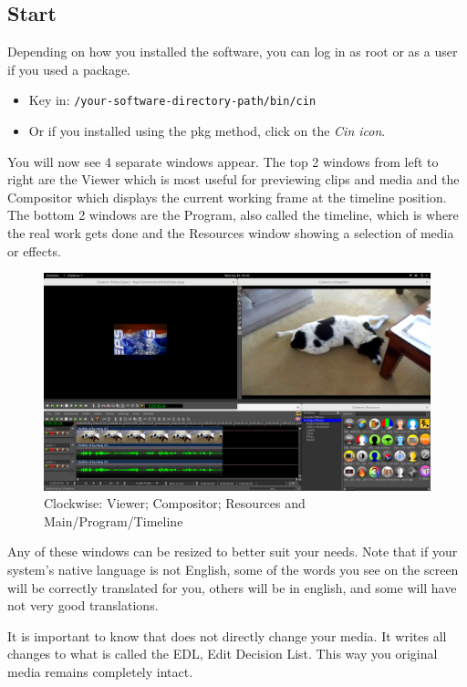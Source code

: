 \subsection{Start \CGG{}}%
\label{sub:start_cinelerra_gg}

Depending on how you installed the software, you can log in as root or as a user if you used a package.

\begin{itemize}[noitemsep]
	\item Key in:  \texttt{/your-software-directory-path/bin/cin}
	\item Or if you installed using the pkg method, click on the \textit{Cin icon}.
\end{itemize}

You will now see 4 separate windows appear.  The top 2 windows from left to right are the Viewer which is most useful for previewing clips and media and the Compositor which displays the current working frame at the timeline position.  The bottom 2 windows are the \CGG{} Program, also called the timeline, which is where the real work gets done and the Resources window showing a selection of media or effects.

\begin{figure}[htpb]
	\centering
	\includegraphics[width=1.0\linewidth]{images/4windows.png}
	\caption{Clockwise: Viewer; Compositor; Resources and Main/Program/Timeline}	
\end{figure}

Any of these windows can be resized to better suit your needs.  Note that if your system’s native language is not English, some of the words you see on the screen will be correctly translated for you, others will be in english, and some will have not very good translations.

It is important to know that \CGG{} does not directly change your media.  It writes all changes to what is called the EDL, Edit Decision List.  This way you original media remains completely intact.

